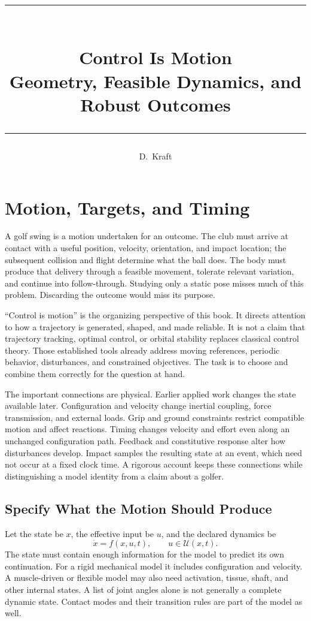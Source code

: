 \documentclass[12pt, openany]{book}
\title{%
  \vspace{-1cm}
  {\color{chapblue}\rule{\textwidth}{2pt}}\\[0.8cm]
  {\Huge\bfseries\color{chapblue} Control Is Motion}\\[0.4cm]
  {\Large Geometry, Feasible Dynamics, and Robust Outcomes}\\[0.6cm]
  {\color{chapblue}\rule{\textwidth}{2pt}}
}
\author{{\Large D.\ Kraft}}
\date{}
\theoremstyle{plain}
\begin{document}
\maketitle
\thispagestyle{empty}

\setcounter{chapter}{0}
\chapter{Motion, Targets, and Timing}
\label{ch:throwing_target}

A golf swing is a motion undertaken for an outcome. The club must arrive at
contact with a useful position, velocity, orientation, and impact location;
the subsequent collision and flight determine what the ball does. The body
must produce that delivery through a feasible movement, tolerate relevant
variation, and continue into follow-through. Studying only a static pose
misses much of this problem. Discarding the outcome would miss its purpose.

``Control is motion'' is the organizing perspective of this book. It directs
attention to how a trajectory is generated, shaped, and made reliable. It is
not a claim that trajectory tracking, optimal control, or orbital stability
replaces classical control theory. Those established tools already address
moving references, periodic behavior, disturbances, and constrained objectives.
The task is to choose and combine them correctly for the question at hand.

The important connections are physical. Earlier applied work changes the
state available later. Configuration and velocity change inertial coupling,
force transmission, and external loads. Grip and ground constraints restrict
compatible motion and affect reactions. Timing changes velocity and effort
even along an unchanged configuration path. Feedback and constitutive response
alter how disturbances develop. Impact samples the resulting state at an event,
which need not occur at a fixed clock time. A rigorous account keeps these
connections while distinguishing a model identity from a claim about a golfer.

\section{Specify What the Motion Should Produce}

Let the state be $x$, the effective input be $u$, and the declared dynamics be
\begin{equation}
 \dot x=f(x,u,t),\qquad u\in\mathcal U(x,t).
 \label{eq:nonlinear_sys}
\end{equation}
The state must contain enough information for the model to predict its own
continuation. For a rigid mechanical model it includes configuration and
velocity. A muscle-driven or flexible model may also need activation, tissue,
shaft, and other internal states. A list of joint angles alone is not generally
a complete dynamic state. Contact modes and their transition rules are part
of the model as well.
\end{document}
